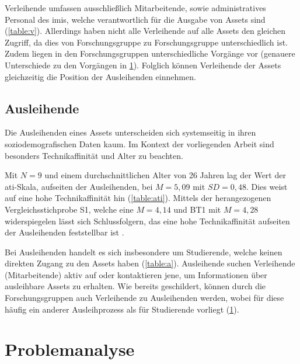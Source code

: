 Verleihende umfassen ausschließlich Mitarbeitende, sowie administratives Personal des \ac{imis},
welche verantwortlich für die Ausgabe von Assets sind (\ref{table:v}). Allerdings haben nicht alle
Verleihende auf alle Assets den gleichen Zugriff, da dies von Forschungsgruppe zu Forschungsgruppe
unterschiedlich ist. Zudem liegen in den Forschungsgruppen unterschiedliche Vorgänge vor (genauere
Unterschiede zu den Vorgängen in \ref{section:iststand}). Folglich können Verleihende der Assets
gleichzeitig die Position der Ausleihenden einnehmen.

\subsection{Ausleihende}
Die Ausleihenden eines Assets unterscheiden sich systemseitig in ihren soziodemografischen Daten
kaum. Im Kontext der vorliegenden Arbeit sind besonders Technikaffinität und Alter zu beachten. 

Mit $N=9$ und einem durchschnittlichen Alter von 26 Jahren lag der Wert der \ac{ati}-Skala,
aufseiten der Ausleihenden, bei $M=5,09$ mit $SD=0,48$. Dies weist auf eine hohe Technikaffinität
hin (\ref{table:ati}). Mittels der herangezogenen Vergleichsstichprobe S1, welche eine $M=4,14$ und
BT1 mit  $M=4,28$ widerspiegelen lässt sich Schlussfolgern, das eine hohe Technikaffinität aufseiten
der Ausleihenden feststellbar ist \cite{franke_personal_2019}. 


Bei Ausleihenden handelt es sich insbesondere um Studierende, welche keinen direkten Zugang zu
den Assets haben (\ref{table:a}). Ausleihende suchen Verleihende (Mitarbeitende) aktiv auf oder
kontaktieren jene, um Informationen über ausleihbare Assets zu erhalten. Wie bereits geschildert,
können durch die Forschungsgruppen auch Verleihende zu Ausleihenden werden, wobei
für diese häufig ein anderer Ausleihprozess als für Studierende vorliegt (\ref{section:iststand}).


\section{Problemanalyse}
\label{section:iststand}


